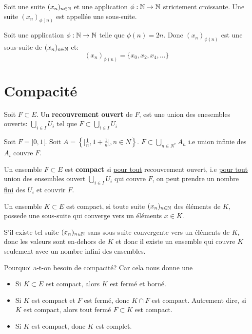 \begin{definition}
    Soit une suite $(x_n)_{n \in \mathbb{N}}$ et une application  $\phi:\mathbb{N} \to \mathbb{N}$ \underline{strictement croissante}. Une suite $(x_n)_{\phi(n)}$ est appellée une sous-suite.
\end{definition}
\begin{eg}
    Soit une application $\phi: \mathbb{N} \to \mathbb{N}$ telle que $\phi(n) = 2n$. Donc  $(x_n)_{\phi(n)}$ est une sous-suite de  $(x_n)_{n \in \mathbb{N}}$ et:
    \[
        (x_n)_{\phi(n)} = \{x_0, x_2, x_4, \ldots\}
    \] 
\end{eg}

\section{Compacité}
\begin{definition}
    Soit $F \subset E$. Un \textbf{recouvrement ouvert} de $F$, est une union des enesembles ouverts:  $\bigcup_{i \in I} U_i$ tel que $F \subset \bigcup_{i \in I} U_i$
\end{definition}
\begin{eg}
    Soit $F = ]0, 1[$. Soit $A = \left\{]\frac{1}{n}, 1 + \frac{1}{n}[, n \in N\right\}$. $F \subset \bigcup_{n \in N^{*}} A_n$ i.e union infinie des $A_i$ couvre $F$.
\end{eg}
\begin{definition}
    Un ensemble $F \subset E$ est \textbf{compact} si \underline{pour tout} recouvrement ouvert, i.e \underline{pour tout} union des ensembles ouvert $\bigcup_{i \in I} U_i$ qui couvre $F$, on peut prendre un nombre \underline{fini} des  $U_i$ et couvrir $F$.
\end{definition}
\begin{theorem}
    Un ensemble $K \subset E$ est compact, si toute suite $(x_n)_{n \in \mathbb{N}}$ des éléments de $K$, possede une sous-suite qui converge  vers un éléments $x \in K$.
\end{theorem}
\begin{intuition}
    S'il existe tel suite $(x_n)_{n \in \mathbb{N}}$ sans sous-suite convergente vers un éléments de  $K$, donc les valeurs sont en-dehors de  $K$ et donc il existe un ensemble qui couvre $K$  seulement avec un nombre infini des ensembles. 
\end{intuition}
Pourquoi a-t-on besoin de compacité? Car cela nous donne une
\begin{prop}
    \begin{itemize}
        \item Si $K \subset E$ est compact, alors $K$ est fermé et borné.
        \item Si $K$ est compact et  $F$ est fermé, donc  $K \cap F$ est compact. Autrement dire, si $K$ est compact, alors tout fermé $F \subset K$ est compact.
        \item Si $K$ est compact, donc  $K$ est complet.
    \end{itemize}
\end{prop}
